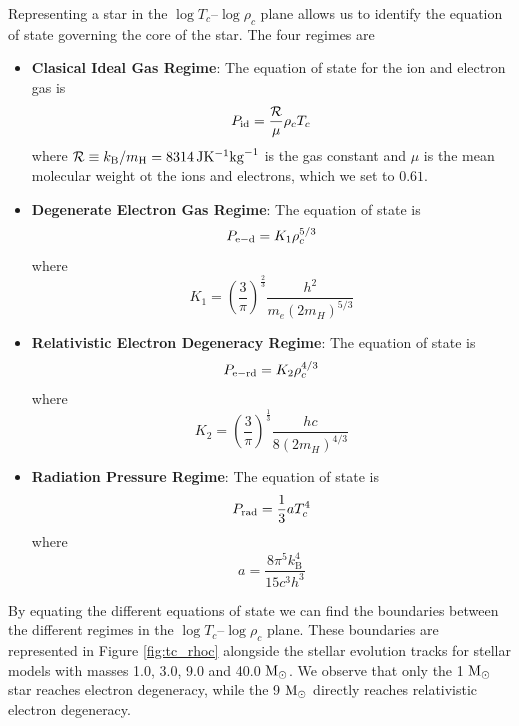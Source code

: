 Representing a star in the $\log T_c \text{--} \log \rho_c$ plane allows us to identify the equation of state governing the core of the star. The four regimes are
\begin{itemize}
    \item \textbf{Clasical Ideal Gas Regime}: The equation of state for the ion and electron gas is
          \begin{equation}
              P_{\rm id} = \frac{\mathcal{R}}{\mu} \rho_c T_c
          \end{equation}
          where $\mathcal{R} \equiv k_{\rm B} / m_{\rm H} = 8314 \, {\rm J}{\rm K}^{-1} {\rm kg}^{-1}$  is the gas constant and $\mu$ is the mean molecular weight ot the ions and electrons, which we set to $0.61$.
    \item \textbf{Degenerate Electron Gas Regime}: The equation of state is
          \begin{equation}
              P_{\rm e-d} = K_1 \rho_c^{5/3}
          \end{equation}
          where
          \[
              K_1 = \left( \frac{3}{\pi} \right)^{\frac{2}{3}} \frac{h^2}{m_e \left(2 m_H \right)^{5/3}}
          \]
    \item \textbf{Relativistic Electron Degeneracy Regime}: The equation of state is
          \begin{equation}
              P_{\rm e-rd} = K_2 \rho_c^{4/3}
          \end{equation}
          where
          \[
              K_2 = \left( \frac{3}{\pi} \right)^{\frac{1}{3}} \frac{h c}{8 \left(2 m_H\right)^{4/3}}
          \]
    \item \textbf{Radiation Pressure Regime}: The equation of state is
          \begin{equation}
              P_{\rm rad} = \frac{1}{3}aT_c^4
          \end{equation}
          where
          \[
              a = \frac{8 \pi^5 k_\text{B}^4}{15 c^3 h^3}
          \]
\end{itemize}

By equating the different equations of state we can find the boundaries between the different regimes in the $\log T_c \text{--} \log \rho_c$ plane. These boundaries are represented in Figure \ref{fig:tc_rhoc} alongside the stellar evolution tracks for stellar models with masses 1.0, 3.0, 9.0 and 40.0 ${\rm M}_\odot$. We observe that only the 1 ${\rm M}_\odot$ star reaches electron degeneracy, while the 9 ${\rm M}_\odot$ directly reaches relativistic electron degeneracy.


